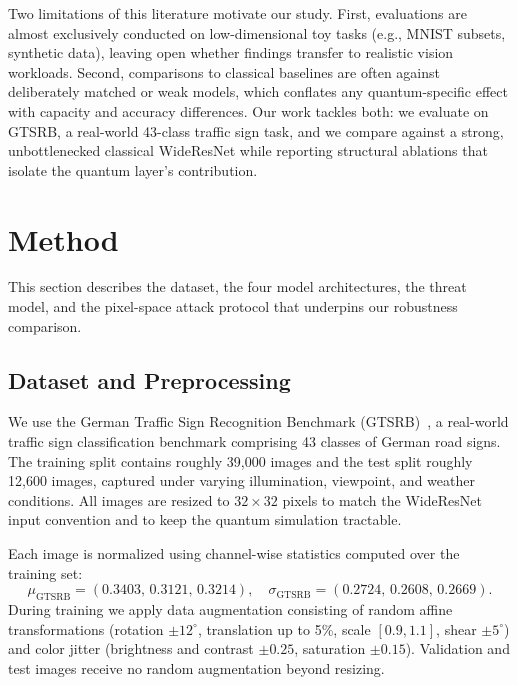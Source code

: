 \documentclass[11pt]{article}
\begin{document}
Two limitations of this literature motivate our study. First, evaluations
are almost exclusively conducted on low-dimensional toy tasks (e.g., MNIST
subsets, synthetic data), leaving open whether findings transfer to
realistic vision workloads. Second, comparisons to classical baselines are
often against deliberately matched or weak models, which conflates any
quantum-specific effect with capacity and accuracy differences. Our work
tackles both: we evaluate on GTSRB, a real-world 43-class traffic sign task,
and we compare against a strong, unbottlenecked classical WideResNet while
reporting structural ablations that isolate the quantum layer's
contribution.

\section{Method}
\label{sec:method}

This section describes the dataset, the four model architectures, the
threat model, and the pixel-space attack protocol that underpins our
robustness comparison.

\subsection{Dataset and Preprocessing}
\label{sec:method:dataset}

We use the German Traffic Sign Recognition Benchmark
(GTSRB)~\cite{stallkamp2012gtsrb}, a real-world traffic sign classification
benchmark comprising 43 classes of German road signs. The training split
contains roughly 39{,}000 images and the test split roughly 12{,}600
images, captured under varying illumination, viewpoint, and weather
conditions. All images are resized to $32 \times 32$ pixels to match the
WideResNet input convention and to keep the quantum simulation tractable.

Each image is normalized using channel-wise statistics computed over the
training set:
\begin{equation}
  \mu_{\text{GTSRB}} = (0.3403,\, 0.3121,\, 0.3214), \quad
  \sigma_{\text{GTSRB}} = (0.2724,\, 0.2608,\, 0.2669).
  \label{eq:norm}
\end{equation}
During training we apply data augmentation consisting of random affine
transformations (rotation $\pm 12^{\circ}$, translation up to 5\%, scale
$[0.9, 1.1]$, shear $\pm 5^{\circ}$) and color jitter (brightness and
contrast $\pm 0.25$, saturation $\pm 0.15$). Validation and test images
receive no random augmentation beyond resizing.
\end{document}
